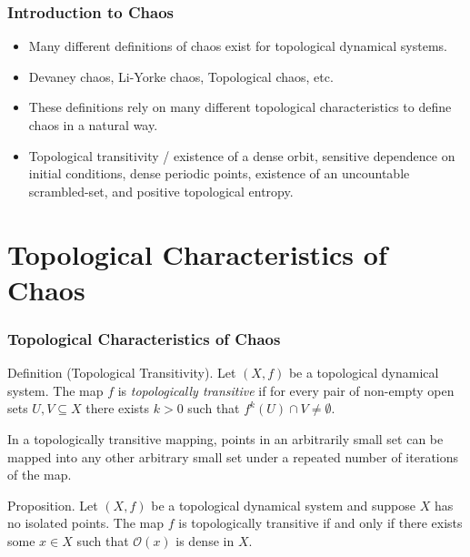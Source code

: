 \documentclass{beamer}
\begin{document}
\begin{frame}
    \frametitle{Introduction to Chaos}
    \begin{itemize}
        \item Many different definitions of chaos exist for topological dynamical systems.
        \item Devaney chaos, Li-Yorke chaos, Topological chaos, etc.
        \item These definitions rely on many different topological characteristics to define chaos in a natural way.
        \item Topological transitivity / existence of a dense orbit, sensitive dependence on initial conditions, dense periodic points, existence of an uncountable scrambled-set, and positive topological entropy.
    \end{itemize}
\end{frame}

\section{Topological Characteristics of Chaos}
\begin{frame}
    \frametitle{Topological Characteristics of Chaos}
    \begin{block}{Definition (Topological Transitivity).}
        Let $(X, f)$ be a topological dynamical system. The map $f$ is \emph{topologically transitive} if for every pair of non-empty open sets $U, V \subseteq X$ there exists $k > 0$ such that $f^k(U) \cap V \neq \emptyset$.
    \end{block}
    \vspace{0.3cm}
    In a topologically transitive mapping, points in an arbitrarily small set can be mapped into any other arbitrary small set under a repeated number of iterations of the map.
    \vspace{0.3cm}
    \begin{block}{Proposition.}
        Let $(X, f)$ be a topological dynamical system and suppose $X$ has no isolated points. The map $f$ is topologically transitive if and only if there exists some $x \in X$ such that $\mathcal{O}(x)$ is dense in $X$. \cite{silverman}
    \end{block}
\end{frame}
\end{document}
